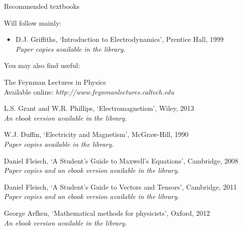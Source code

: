 %
%
%

\begin{frame}{Recommended textbooks}

Will follow mainly:
\begin{itemize}
    \item D.J. Griffiths, `Introduction to Electrodynamics', Prentice Hall, 1999\\
          {\it Paper copies available in the library.}
\end{itemize}

You may also find useful:
\begin{itemize}
{\footnotesize
    \item The Feynman Lectures in Physics\\
          Available online: {\it http://www.feynmanlectures.caltech.edu}
    \item L.S. Grant and W.R. Phillips, `Electromagnetism', Wiley, 2013\\
         {\it An ebook version available in the library.}
    \item W.J. Duffin, `Electricity and Magnetism', McGraw-Hill, 1990\\
          {\it Paper copies available in the library.}
    \item Daniel Fleisch, `A Student's Guide to Maxwell's Equations', Cambridge, 2008\\
         {\it Paper copies and an ebook version available in the library.}
    \item Daniel Fleisch, `A Student's Guide to Vectors and Tensors', Cambridge, 2011\\
         {\it Paper copies and an ebook version available in the library.}
    \item George Arfken, `Mathematical methods for physicists', Oxford, 2012\\
         {\it An ebook version available in the library.}
}
\end{itemize}

\end{frame}


%
%
%

